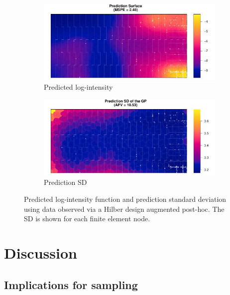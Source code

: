 \documentclass[review]{elsarticle}
\begin{document}
\begin{figure}

\begin{subfigure}{5in}
\includegraphics[width=5in]{../graphics/lambda-Aug-LGCP000004.pdf}
\caption{Predicted log-intensity}
\label{lambdaaug}
\end{subfigure}

\begin{subfigure}{5in}
\includegraphics[width=5in]{../graphics/lambdaSD-Aug-LGCP000004.pdf}
\caption{Prediction SD}
\label{sdaug}
\end{subfigure}

\caption{Predicted log-intensity function and prediction standard deviation
using data observed via a Hilber design augmented post-hoc. The SD is shown for
each finite element node.}
\label{aug}
\end{figure}


\section{Discussion}

\subsection{Implications for sampling}
\end{document}
